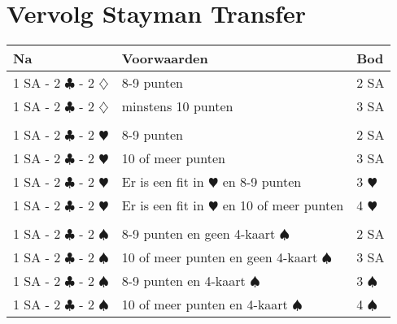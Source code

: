 \documentclass[12pt,a4paper]{report}
\begin{document}
\section{Vervolg Stayman Transfer}
\begin{tabular}{|l|p{4cm}|l|}
	\hline 
	\textbf{Na} &\textbf{Voorwaarden}  &\textbf{Bod}  \\  
	\hline
	
	1 SA - 2 $\clubsuit$ - 2 $\diamondsuit$
	& 8-9 punten
	& 2 SA\\
	\hline
	
	1 SA - 2 $\clubsuit$ - 2 $\diamondsuit$
	& minstens 10 punten 
	& 3 SA\\
	\hline
	
	&
	& \\
	\hline
	
	1 SA - 2 $\clubsuit$ - 2 $\varheartsuit$
	& 8-9 punten 
	& 2 SA \\
	\hline
	
	1 SA - 2 $\clubsuit$ - 2 $\varheartsuit$
	& 10 of meer punten 
	& 3 SA \\
	\hline
	
	1 SA - 2 $\clubsuit$ - 2 $\varheartsuit$
	& Er is een fit in $\varheartsuit$\newline
	  en 8-9 punten
	& 3 $\varheartsuit$ \\
	\hline
	
	1 SA - 2 $\clubsuit$ - 2 $\varheartsuit$
	& Er is een fit in $\varheartsuit$\newline
	  en 10 of meer punten
	& 4 $\varheartsuit$ \\
	\hline
	
	&
	& \\
	\hline
	
	1 SA - 2 $\clubsuit$ - 2 $\spadesuit$
	& 8-9 punten\newline 
	  en geen 4-kaart $\spadesuit$
	& 2 SA \\
	\hline
	
	1 SA - 2 $\clubsuit$ - 2 $\spadesuit$
	& 10 of meer  punten\newline 
	  en geen 4-kaart $\spadesuit$
	& 3 SA \\
	\hline
	
	1 SA - 2 $\clubsuit$ - 2 $\spadesuit$
	& 8-9 punten\newline
	  en  4-kaart $\spadesuit$
	& 3 $\spadesuit$ \\
	\hline
	
	1 SA - 2 $\clubsuit$ - 2 $\spadesuit$
	& 10 of meer punten\newline
	  en  4-kaart $\spadesuit$
	& 4 $\spadesuit$ \\
	\hline	
	

\end{tabular}
\end{document}
